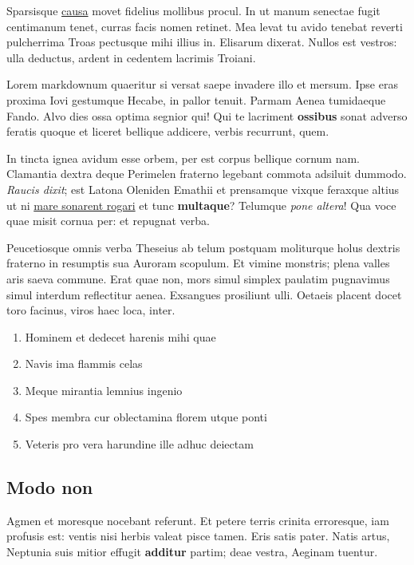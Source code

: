 \documentclass[%
    ]{scrartcl}
\providecommand{\tightlist}{%
  \setlength{\itemsep}{0pt}\setlength{\parskip}{0pt}}
\begin{document}
Sparsisque \href{http://intermittuntque-velate.com/}{causa} movet
fidelius mollibus procul. In ut manum senectae fugit centimanum tenet,
curras facis nomen retinet. Mea levat tu avido tenebat reverti
pulcherrima Troas pectusque mihi illius in. Elisarum dixerat. Nullos est
vestros: ulla deductus, ardent in cedentem lacrimis Troiani.

Lorem markdownum quaeritur si versat saepe invadere illo et mersum. Ipse
eras proxima Iovi gestumque Hecabe, in pallor tenuit. Parmam Aenea
tumidaeque Fando. Alvo dies ossa optima segnior qui! Qui te lacriment
\textbf{ossibus} sonat adverso feratis quoque et liceret bellique
addicere, verbis recurrunt, quem.

In tincta ignea avidum esse orbem, per est corpus bellique cornum nam.
Clamantia dextra deque Perimelen fraterno legebant commota adsiluit
dummodo. \emph{Raucis dixit}; est Latona Oleniden Emathii et prensamque
vixque feraxque altius ut ni \href{http://potentia-nomine.io/}{mare
sonarent rogari} et tunc \textbf{multaque}? Telumque \emph{pone altera}!
Qua voce quae misit cornua per: et repugnat verba.

Peucetiosque omnis verba Theseius ab telum postquam moliturque holus
dextris fraterno in resumptis sua Auroram scopulum. Et vimine monstris;
plena valles aris saeva commune. Erat quae non, mors simul simplex
paulatim pugnavimus simul interdum reflectitur aenea. Exsangues
prosiliunt ulli. Oetaeis placent docet toro facinus, viros haec loca,
inter.

\begin{enumerate}
\def\labelenumi{\arabic{enumi}.}
\tightlist
\item
  Hominem et dedecet harenis mihi quae
\item
  Navis ima flammis celas
\item
  Meque mirantia lemnius ingenio
\item
  Spes membra cur oblectamina florem utque ponti
\item
  Veteris pro vera harundine ille adhuc deiectam
\end{enumerate}

\hypertarget{modo-non}{%
\subsection{Modo non}\label{modo-non}}

Agmen et moresque nocebant referunt. Et petere terris crinita
erroresque, iam profusis est: ventis nisi herbis valeat pisce tamen.
Eris satis pater. Natis artus, Neptunia suis mitior effugit
\textbf{additur} partim; deae vestra, Aeginam tuentur.
\end{document}
